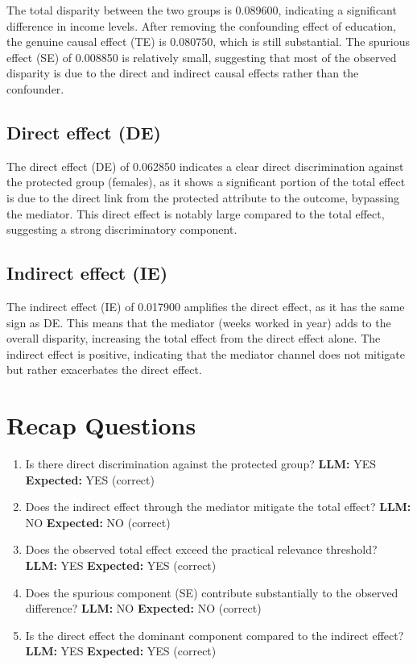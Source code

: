 \documentclass[11pt]{article}
\begin{document}
The total disparity between the two groups is 0.089600, indicating a significant difference in income levels. After removing the confounding effect of education, the genuine causal effect (TE) is 0.080750, which is still substantial. The spurious effect (SE) of 0.008850 is relatively small, suggesting that most of the observed disparity is due to the direct and indirect causal effects rather than the confounder.

\subsection{Direct effect (DE)}

The direct effect (DE) of 0.062850 indicates a clear direct discrimination against the protected group (females), as it shows a significant portion of the total effect is due to the direct link from the protected attribute to the outcome, bypassing the mediator. This direct effect is notably large compared to the total effect, suggesting a strong discriminatory component.

\subsection{Indirect effect (IE)}

The indirect effect (IE) of 0.017900 amplifies the direct effect, as it has the same sign as DE. This means that the mediator (weeks worked in year) adds to the overall disparity, increasing the total effect from the direct effect alone. The indirect effect is positive, indicating that the mediator channel does not mitigate but rather exacerbates the direct effect.

\section{Recap Questions}

\begin{enumerate}
\item Is there direct discrimination against the protected group? \textbf{LLM:} YES \quad \textbf{Expected:} YES \quad (correct)
\item Does the indirect effect through the mediator mitigate the total effect? \textbf{LLM:} NO \quad \textbf{Expected:} NO \quad (correct)
\item Does the observed total effect exceed the practical relevance threshold? \textbf{LLM:} YES \quad \textbf{Expected:} YES \quad (correct)
\item Does the spurious component (SE) contribute substantially to the observed difference? \textbf{LLM:} NO \quad \textbf{Expected:} NO \quad (correct)
\item Is the direct effect the dominant component compared to the indirect effect? \textbf{LLM:} YES \quad \textbf{Expected:} YES \quad (correct)
\end{enumerate}
\end{document}
